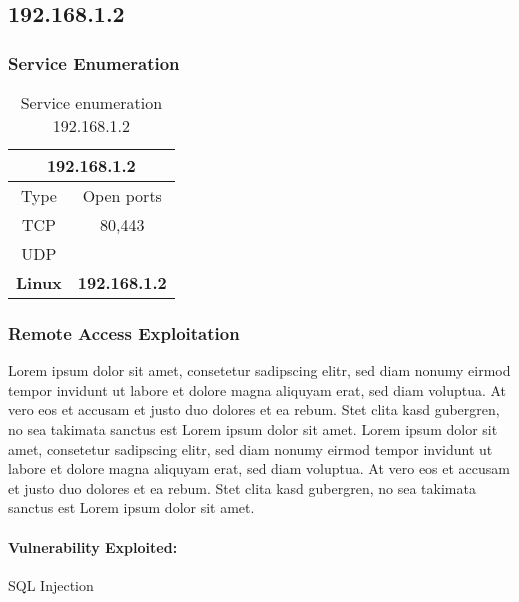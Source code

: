 
\renewcommand{\hostname}{192.168.1.2}
\renewcommand{\os}{Linux}
\renewcommand{\ip}{192.168.1.2}
\renewcommand{\tcpports}{80,443}
\renewcommand{\udpports}{}
\renewcommand{\vuln}{SQL Injection}


\subsection{\hostname}
\subsubsection{Service Enumeration}

\begin{table}[h]
	\begin{tabular}{|c|c|}
		\hline
		\multicolumn{2}{|c|}{\textbf{\hostname}}\\\hline\hline
		Type         & Open ports   \\\hline
		TCP          & \tcpports{}  \\\hline
		UDP          & \udpports{}  \\\hline\hline
		\textbf{\os} & \textbf{\ip} \\\hline
	\end{tabular}
	\caption{Service enumeration \hostname}
\end{table}


\subsubsection{Remote Access Exploitation}
Lorem ipsum dolor sit amet, consetetur sadipscing elitr, sed diam nonumy eirmod
tempor invidunt ut labore et dolore magna aliquyam erat, sed diam voluptua. At
vero eos et accusam et justo duo dolores et ea rebum. Stet clita kasd
gubergren, no sea takimata sanctus est Lorem ipsum dolor sit amet. Lorem ipsum
dolor sit amet, consetetur sadipscing elitr, sed diam nonumy eirmod tempor
invidunt ut labore et dolore magna aliquyam erat, sed diam voluptua. At vero
eos et accusam et justo duo dolores et ea rebum. Stet clita kasd gubergren, no
sea takimata sanctus est Lorem ipsum dolor sit amet.

\paragraph{Vulnerability Exploited:}
\vuln

